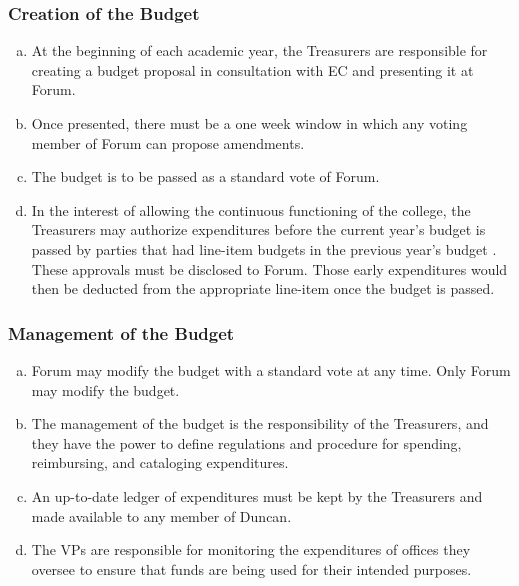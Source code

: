 \documentclass[USletter,12pt]{article}
\begin{document}
\subsubsection{Creation of the Budget}
\begin{enumerate}[(a)]
\item At the beginning of each academic year, the Treasurers are responsible for creating a budget proposal in consultation with EC and presenting it at Forum.  
\item Once presented, there must be a one week window in which any voting member of Forum can propose amendments.
\item The budget is to be passed as a standard vote of Forum.
\item In the interest of allowing the continuous functioning of the college, the Treasurers may authorize expenditures before the current year's budget is passed by parties that had line-item budgets in the previous year's budget .  These approvals must be disclosed to Forum.  Those early expenditures would then be deducted from the appropriate line-item once the budget is passed.
\end{enumerate}

\subsubsection{Management of the Budget}
\begin{enumerate}[(a)]
\item Forum may modify the budget with a standard vote at any time.  Only Forum may modify the budget.
\item The management of the budget is the responsibility of the Treasurers, and they have the power to define regulations and procedure for spending, reimbursing, and cataloging expenditures.
\item An up-to-date ledger of expenditures must be kept by the Treasurers and made available to any member of Duncan.
\item The VPs are responsible for monitoring the expenditures of offices they oversee to ensure that funds are being used for their intended purposes.
\end{enumerate}
\end{document}
